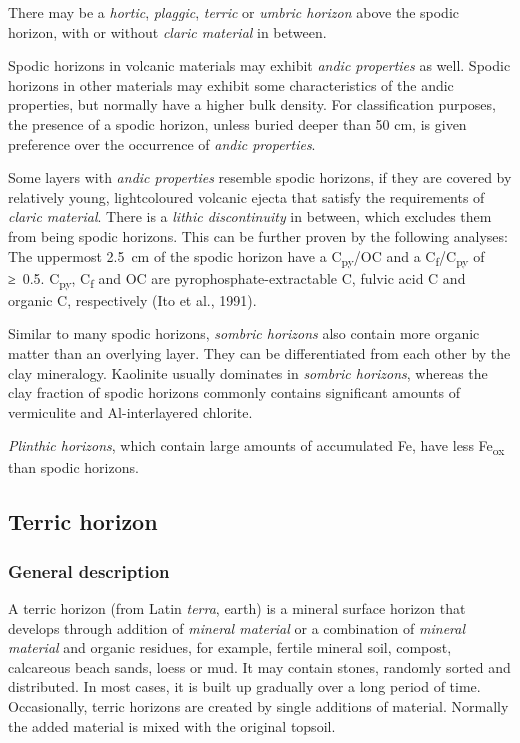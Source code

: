 \documentclass[
  letterpaper,
  DIV=11,
  numbers=noendperiod]{scrreprt}
\begin{document}
There may be a \emph{hortic}, \emph{plaggic}, \emph{terric} or
\emph{umbric horizon} above the spodic horizon, with or without
\emph{claric material} in between.

Spodic horizons in volcanic materials may exhibit \emph{andic
properties} as well. Spodic horizons in other materials may exhibit some
characteristics of the andic properties, but normally have a higher bulk
density. For classification purposes, the presence of a spodic horizon,
unless buried deeper than 50 cm, is given preference over the occurrence
of \emph{andic properties}.

Some layers with \emph{andic properties} resemble spodic horizons, if
they are covered by relatively young, lightcoloured volcanic ejecta that
satisfy the requirements of \emph{claric material}. There is a
\emph{lithic discontinuity} in between, which excludes them from being
spodic horizons. This can be further proven by the following analyses:
The uppermost 2.5~cm of the spodic horizon have a C\textsubscript{py}/OC
and a C\textsubscript{f}/C\textsubscript{py} of ≥~0.5.
C\textsubscript{py}, C\textsubscript{f} and OC are
pyrophosphate-extractable C, fulvic acid C and organic C, respectively
(Ito et al., 1991).

Similar to many spodic horizons, \emph{sombric horizons} also contain
more organic matter than an overlying layer. They can be differentiated
from each other by the clay mineralogy. Kaolinite usually dominates in
\emph{sombric horizons}, whereas the clay fraction of spodic horizons
commonly contains significant amounts of vermiculite and Al-interlayered
chlorite.

\emph{Plinthic horizons}, which contain large amounts of accumulated Fe,
have less Fe\textsubscript{ox} than spodic horizons.

\hypertarget{terric-horizon}{%
\subsection{Terric horizon}\label{terric-horizon}}

\hypertarget{general-description-35}{%
\subsubsection{General description}\label{general-description-35}}

A terric horizon (from Latin \emph{terra}, earth) is a mineral surface
horizon that develops through addition of \emph{mineral material} or a
combination of \emph{mineral material} and organic residues, for
example, fertile mineral soil, compost, calcareous beach sands, loess or
mud. It may contain stones, randomly sorted and distributed. In most
cases, it is built up gradually over a long period of time.
Occasionally, terric horizons are created by single additions of
material. Normally the added material is mixed with the original
topsoil.
\end{document}
